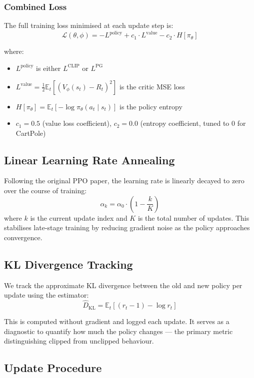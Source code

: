 \documentclass[12pt,a4paper]{article}
\begin{document}
\subsubsection{Combined Loss}

The full training loss minimised at each update step is:
\[
\mathcal{L}(\theta, \phi) = -L^{\text{policy}} + c_1 \cdot L^{\text{value}} - c_2 \cdot H[\pi_\theta]
\]

where:
\begin{itemize}[noitemsep]
    \item $L^{\text{policy}}$ is either $L^{\text{CLIP}}$ or $L^{\text{PG}}$
    \item $L^{\text{value}} = \frac{1}{2}\mathbb{E}_t[(V_\phi(s_t) - R_t)^2]$ is the critic MSE loss
    \item $H[\pi_\theta] = \mathbb{E}_t[-\log \pi_\theta(a_t \mid s_t)]$ is the policy entropy
    \item $c_1 = 0.5$ (value loss coefficient), $c_2 = 0.0$ (entropy coefficient, tuned to 0 for CartPole)
\end{itemize}

\subsection{Linear Learning Rate Annealing}

Following the original PPO paper, the learning rate is linearly decayed to zero over the course of training:
\[
\alpha_k = \alpha_0 \cdot \left(1 - \frac{k}{K}\right)
\]
where $k$ is the current update index and $K$ is the total number of updates. This stabilises late-stage training by reducing gradient noise as the policy approaches convergence.

\subsection{KL Divergence Tracking}

We track the approximate KL divergence between the old and new policy per update using the estimator:
\[
\widehat{D}_\text{KL} = \mathbb{E}_t \left[ (r_t - 1) - \log r_t \right]
\]

This is computed without gradient and logged each update. It serves as a diagnostic to quantify how much the policy changes --- the primary metric distinguishing clipped from unclipped behaviour.

\subsection{Update Procedure}
\end{document}
